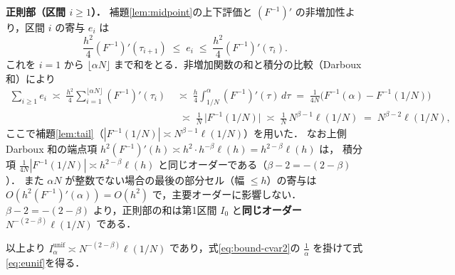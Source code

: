 \documentclass[a4paper,10pt]{jsarticle}
\makeatletter
\theoremstyle{definition}
\renewenvironment{proof}[1][\proofname]{\par
  \pushQED{\qed}%
  \normalfont \topsep6\p@\@plus6\p@\relax
  \trivlist
  \item[\hskip\labelsep\textbf{#1}]\ignorespaces
}{%
  \popQED\endtrivlist\@endpefalse
}
\renewcommand{\proofname}{証明}
\newcommand{\Finv}{F^{-1}}
\makeatother
\begin{document}
\begin{proof}
\noindent\textbf{正則部（区間 $i\ge1$）．}
補題\ref{lem:midpoint}の上下評価と $(\Finv)'$ の非増加性より，区間 $i$ の寄与 $e_i$ は
\begin{equation*}
  \frac{h^2}{4}(\Finv)'(\tau_{i+1})\;\le\;e_i\;\le\;\frac{h^2}{4}(\Finv)'(\tau_i).
\end{equation*}
これを $i=1$ から $\lfloor\alpha N\rfloor$ まで和をとる．非増加関数の和と積分の比較（Darboux 和）により
\begin{align*}
\sum_{i\ge1}e_i\;\asymp\;\frac{h^2}{4}\sum_{i=1}^{\lfloor\alpha N\rfloor}(\Finv)'(\tau_i)
\;&\asymp\;\frac{h}{4}\int_{1/N}^{\alpha}(\Finv)'(\tau)\,d\tau
\;=\;\frac1{4N}\bigl(\Finv(\alpha)-\Finv(1/N)\bigr)\\
&\;\asymp\;\frac1N\,\bigl|\Finv(1/N)\bigr|
\;\asymp\;\frac1N\,N^{\beta-1}\ell(1/N)
\;=\;N^{\beta-2}\ell(1/N),
\end{align*}
ここで補題\ref{lem:tail}（$|\Finv(1/N)|\asymp N^{\beta-1}\ell(1/N)$）を用いた．
なお上側 Darboux 和の端点項 $h^2(\Finv)'(h)\asymp h^2\cdot h^{-\beta}\ell(h)=h^{2-\beta}\ell(h)$ は，
積分項 $\frac1{4N}|\Finv(1/N)|\asymp h^{2-\beta}\ell(h)$ と同じオーダーである（$\beta-2=-(2-\beta)$）．
また $\alpha N$ が整数でない場合の最後の部分セル（幅 $\le h$）の寄与は $O(h^2(\Finv)'(\alpha))=O(h^2)$ で，主要オーダーに影響しない．
$\beta-2=-(2-\beta)$ より，正則部の和は第1区間 $I_0$ と\textbf{同じオーダー} $N^{-(2-\beta)}\ell(1/N)$ である．

以上より $I_\alpha^{\mathrm{unif}}\asymp N^{-(2-\beta)}\ell(1/N)$ であり，式\eqref{eq:bound-cvar2}の $\frac1\alpha$ を掛けて式\eqref{eq:eunif}を得る．
\end{proof}
\end{document}

